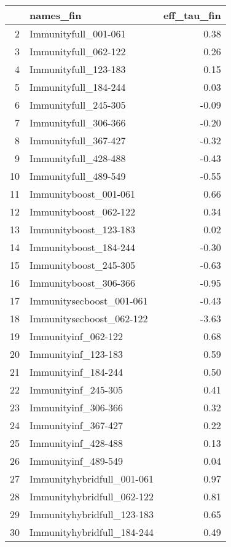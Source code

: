 \begin{table}[ht]
\centering
\begin{tabular}{rlr}
  \hline
 & names\_fin & eff\_tau\_fin \\ 
  \hline
2 & Immunityfull\_001-061 & 0.38 \\ 
  3 & Immunityfull\_062-122 & 0.26 \\ 
  4 & Immunityfull\_123-183 & 0.15 \\ 
  5 & Immunityfull\_184-244 & 0.03 \\ 
  6 & Immunityfull\_245-305 & -0.09 \\ 
  7 & Immunityfull\_306-366 & -0.20 \\ 
  8 & Immunityfull\_367-427 & -0.32 \\ 
  9 & Immunityfull\_428-488 & -0.43 \\ 
  10 & Immunityfull\_489-549 & -0.55 \\ 
  11 & Immunityboost\_001-061 & 0.66 \\ 
  12 & Immunityboost\_062-122 & 0.34 \\ 
  13 & Immunityboost\_123-183 & 0.02 \\ 
  14 & Immunityboost\_184-244 & -0.30 \\ 
  15 & Immunityboost\_245-305 & -0.63 \\ 
  16 & Immunityboost\_306-366 & -0.95 \\ 
  17 & Immunitysecboost\_001-061 & -0.43 \\ 
  18 & Immunitysecboost\_062-122 & -3.63 \\ 
  19 & Immunityinf\_062-122 & 0.68 \\ 
  20 & Immunityinf\_123-183 & 0.59 \\ 
  21 & Immunityinf\_184-244 & 0.50 \\ 
  22 & Immunityinf\_245-305 & 0.41 \\ 
  23 & Immunityinf\_306-366 & 0.32 \\ 
  24 & Immunityinf\_367-427 & 0.22 \\ 
  25 & Immunityinf\_428-488 & 0.13 \\ 
  26 & Immunityinf\_489-549 & 0.04 \\ 
  27 & Immunityhybridfull\_001-061 & 0.97 \\ 
  28 & Immunityhybridfull\_062-122 & 0.81 \\ 
  29 & Immunityhybridfull\_123-183 & 0.65 \\ 
  30 & Immunityhybridfull\_184-244 & 0.49 \\ 

\end{tabular}
\end{table}
